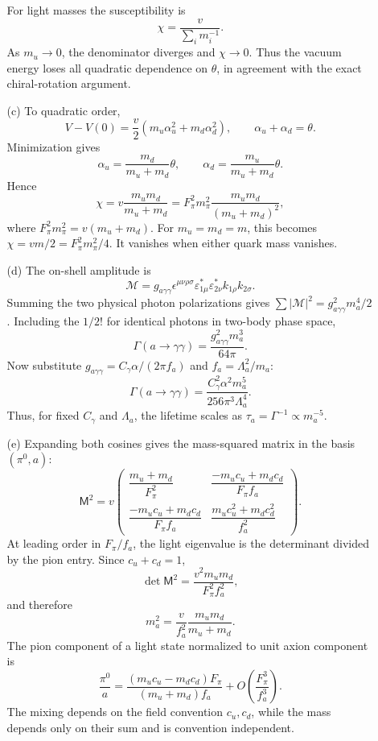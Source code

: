 \begin{enumerate}
\begin{enumerate}
    For light masses the susceptibility is
    \[
      \chi=\frac{v}{\displaystyle\sum_i m_i^{-1}}.
    \]
    As \(m_u\to0\), the denominator diverges and
    \(\chi\to0\).  Thus the vacuum energy loses all quadratic dependence
    on \(\theta\), in agreement with the exact chiral-rotation argument.
    \item[(c)]
    To quadratic order,
    \[
      V-V(0)=\frac v2(m_u\alpha_u^2+m_d\alpha_d^2),
      \qquad \alpha_u+\alpha_d=\theta.
    \]
    Minimization gives
    \[
      \alpha_u=\frac{m_d}{m_u+m_d}\theta,\qquad
      \alpha_d=\frac{m_u}{m_u+m_d}\theta.
    \]
    Hence
    \[
      \boxed{\chi=v\frac{m_um_d}{m_u+m_d}
        =F_\pi^2m_\pi^2
         \frac{m_um_d}{(m_u+m_d)^2},}
    \]
    where \(F_\pi^2m_\pi^2=v(m_u+m_d)\).
    For \(m_u=m_d=m\), this becomes
    \(\chi=vm/2=F_\pi^2m_\pi^2/4\).  It vanishes when either quark mass
    vanishes.
    \item[(d)]
    The on-shell amplitude is
    \[
      \mathcal M
        =g_{a\gamma\gamma}
         \epsilon^{\mu\nu\rho\sigma}
         \varepsilon_{1\mu}^*\varepsilon_{2\nu}^*
         k_{1\rho}k_{2\sigma}.
    \]
    Summing the two physical photon polarizations gives
    \(\sum\lvert\mathcal M\rvert^2
      =g_{a\gamma\gamma}^2m_a^4/2\).
    Including the \(1/2!\) for identical photons in two-body phase space,
    \[
      \boxed{\Gamma(a\to\gamma\gamma)
        =\frac{g_{a\gamma\gamma}^2m_a^3}{64\pi}.}
    \]
    Now substitute
    \(g_{a\gamma\gamma}=C_\gamma\alpha/(2\pi f_a)\) and
    \(f_a=\Lambda_a^2/m_a\):
    \[
      \boxed{\Gamma(a\to\gamma\gamma)
        =\frac{C_\gamma^2\alpha^2m_a^5}
         {256\pi^3\Lambda_a^4}.}
    \]
    Thus, for fixed \(C_\gamma\) and \(\Lambda_a\), the lifetime scales as
    \(\tau_a=\Gamma^{-1}\propto m_a^{-5}\).
    \item[(e)]
    Expanding both cosines gives the mass-squared matrix in the basis
    \((\pi^0,a)\):
    \[
      \mathsf M^2=v
      \begin{pmatrix}
        \dfrac{m_u+m_d}{F_\pi^2}&
        \dfrac{-m_uc_u+m_dc_d}{F_\pi f_a}\\[6pt]
        \dfrac{-m_uc_u+m_dc_d}{F_\pi f_a}&
        \dfrac{m_uc_u^2+m_dc_d^2}{f_a^2}
      \end{pmatrix}.
    \]
    At leading order in \(F_\pi/f_a\), the light eigenvalue is the
    determinant divided by the pion entry.  Since \(c_u+c_d=1\),
    \[
      \det\mathsf M^2
        =\frac{v^2m_um_d}{F_\pi^2f_a^2},
    \]
    and therefore
    \[
      \boxed{m_a^2=
        \frac{v}{f_a^2}\frac{m_um_d}{m_u+m_d}.}
    \]
    The pion component of a light state normalized to unit axion
    component is
    \[
      \frac{\pi^0}{a}
        =\frac{(m_uc_u-m_dc_d)F_\pi}
         {(m_u+m_d)f_a}
         +O\left(\frac{F_\pi^3}{f_a^3}\right).
    \]
    The mixing depends on the field convention \(c_u,c_d\), while the
    mass depends only on their sum and is convention independent.
  \end{enumerate}


\end{enumerate}
